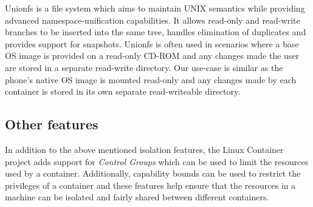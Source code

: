 Unionfs is a file system which aims to maintain UNIX semantics while providing advanced namespace-unification capabilities. It allows read-only and read-write branches to be inserted into the same tree, handles elimination of duplicates and provides support for snapshots. Unionfs is often used in scenarios where a base OS image is provided on a read-only CD-ROM and any changes made the user are stored in a separate read-write directory. Our use-case is similar as the phone's native OS image is mounted read-only and any changes made by each container is stored in its own separate read-writeable directory.

\subsection{Other features}
In addition to the above mentioned isolation features, the Linux Container project adds support for \emph{Control Groups} which can be used to limit the resources used by a container. Additionally, capability bounds can be used to restrict the privileges of a container and these features help ensure that the resources in a machine can be isolated and fairly shared between different containers.
